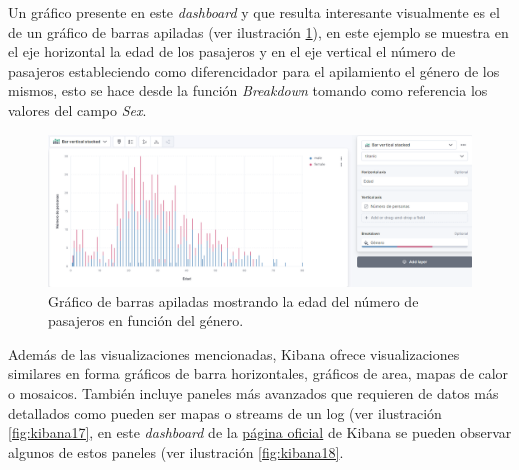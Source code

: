 Un gráfico presente en este \textit{dashboard} y que resulta interesante visualmente es el de un gráfico de barras apiladas (ver ilustración \ref{fig:kibana16}), en este ejemplo se muestra en el eje horizontal la edad de los pasajeros y en el eje vertical el número de pasajeros estableciendo como diferencidador para el apilamiento el género de los mismos, esto se hace desde la función \textit{Breakdown} tomando como referencia los valores del campo \textit{Sex}.

\begin{figure}
    \centering
    \includegraphics[width=1\linewidth]{img/kibana16.png}
    \caption{Gráfico de barras apiladas mostrando la edad del número de pasajeros en función del género.}
    \label{fig:kibana16}
\end{figure}

Además de las visualizaciones mencionadas, Kibana ofrece visualizaciones similares en forma gráficos de barra horizontales, gráficos de area, mapas de calor o mosaicos. También incluye paneles más avanzados que requieren de datos más detallados como pueden ser mapas o streams de un log (ver ilustración  \ref{fig:kibana17}, en este \textit{dashboard} de la \href{https://www.elastic.co/es/blog/kibana-3-0-0-ga-now-available}{página oficial} de Kibana se pueden observar algunos de estos paneles (ver ilustración  \ref{fig:kibana18}.

